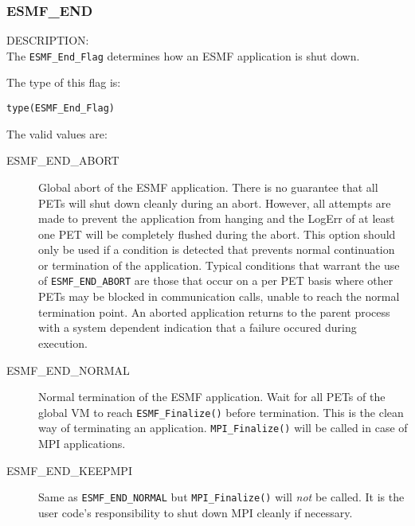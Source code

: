 
\subsubsection{ESMF\_END}
\label{const:endflag}

{\sf DESCRIPTION:\\}
The {\tt ESMF\_End\_Flag} determines how an ESMF application is shut down.

The type of this flag is:

{\tt type(ESMF\_End\_Flag)}

The valid values are:
\begin{description}
   \item [ESMF\_END\_ABORT] 
         Global abort of the ESMF application. There is no guarantee 
         that all PETs will shut down cleanly during an abort. However, all
         attempts are made to prevent the application from hanging and the
         LogErr of at least one PET will be completely flushed during the abort.
         This option should only be used if a condition is detected that
         prevents normal continuation or termination of the application.
         Typical conditions that warrant the use of {\tt ESMF\_END\_ABORT} 
         are those that occur on a per PET basis where other PETs may be blocked
         in communication calls, unable to reach the normal termination point.
         An aborted application returns to the parent process with a system
         dependent indication that a failure occured during execution.
   \item [ESMF\_END\_NORMAL]
         \begin{sloppypar}
         Normal termination of the ESMF application. Wait for all PETs of the
         global VM to reach 
	{\tt ESMF\_Finalize()} before termination. This is
         the clean way of terminating an application. {\tt MPI\_Finalize()} will
         be called in case of MPI applications.
         \end{sloppypar}
   \item [ESMF\_END\_KEEPMPI]
         Same as {\tt ESMF\_END\_NORMAL} but {\tt MPI\_Finalize()} will {\em not}
         be called. It is the user code's responsibility to shut down MPI
         cleanly if necessary.
\end{description}
